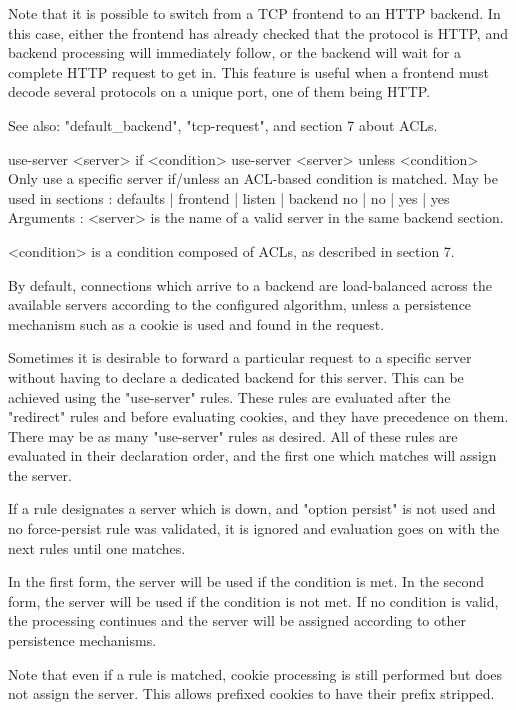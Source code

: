   Note that it is possible to switch from a TCP frontend to an HTTP backend. In
  this case, either the frontend has already checked that the protocol is HTTP,
  and backend processing will immediately follow, or the backend will wait for
  a complete HTTP request to get in. This feature is useful when a frontend
  must decode several protocols on a unique port, one of them being HTTP.

  See also: "default_backend", "tcp-request", and section 7 about ACLs.


use-server <server> if <condition>
use-server <server> unless <condition>
  Only use a specific server if/unless an ACL-based condition is matched.
  May be used in sections :   defaults | frontend | listen | backend
                                  no   |    no    |   yes  |   yes
  Arguments :
    <server>    is the name of a valid server in the same backend section.

    <condition> is a condition composed of ACLs, as described in section 7.

  By default, connections which arrive to a backend are load-balanced across
  the available servers according to the configured algorithm, unless a
  persistence mechanism such as a cookie is used and found in the request.

  Sometimes it is desirable to forward a particular request to a specific
  server without having to declare a dedicated backend for this server. This
  can be achieved using the "use-server" rules. These rules are evaluated after
  the "redirect" rules and before evaluating cookies, and they have precedence
  on them. There may be as many "use-server" rules as desired. All of these
  rules are evaluated in their declaration order, and the first one which
  matches will assign the server.

  If a rule designates a server which is down, and "option persist" is not used
  and no force-persist rule was validated, it is ignored and evaluation goes on
  with the next rules until one matches.

  In the first form, the server will be used if the condition is met. In the
  second form, the server will be used if the condition is not met. If no
  condition is valid, the processing continues and the server will be assigned
  according to other persistence mechanisms.

  Note that even if a rule is matched, cookie processing is still performed but
  does not assign the server. This allows prefixed cookies to have their prefix
  stripped.

